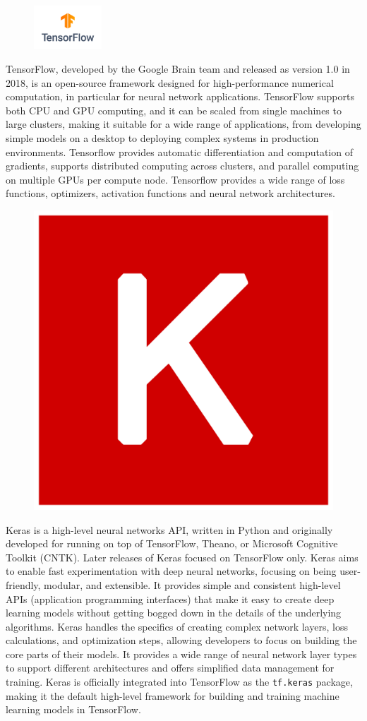 \begin{figure}
\begin{center}
\includegraphics[width=1in]{tflogo.png}
\end{center}
\end{figure}
TensorFlow, developed by the Google Brain team and released as version 1.0 in 2018, is an open-source framework designed for high-performance numerical computation, in particular for neural network applications. TensorFlow supports both CPU and GPU computing, and it can be scaled from single machines to large clusters, making it suitable for a wide range of applications, from developing simple models on a desktop to deploying complex systems in production environments. Tensorflow provides automatic differentiation and computation of gradients, supports distributed computing across clusters, and parallel computing on multiple GPUs per compute node. Tensorflow provides a wide range of loss functions, optimizers, activation functions and neural network architectures.

\begin{figure}
\begin{center}
\includegraphics[width=.75in]{keraslogo.png}
\end{center}
\end{figure}
Keras is a high-level neural networks API, written in Python and originally developed for running on top of TensorFlow, Theano, or Microsoft Cognitive Toolkit (CNTK). Later releases of Keras focused on TensorFlow only. Keras aims to enable fast experimentation with deep neural networks, focusing on being user-friendly, modular, and extensible. It provides simple and consistent high-level APIs (application programming interfaces) that make it easy to create deep learning models without getting bogged down in the details of the underlying algorithms. Keras handles the specifics of creating complex network layers, loss calculations, and optimization steps, allowing developers to focus on building the core parts of their models. It provides a wide range of neural network layer types to support different architectures and offers simplified data management for training. Keras is officially integrated into TensorFlow as the \texttt{tf.keras} package, making it the default high-level framework for building and training machine learning models in TensorFlow.

